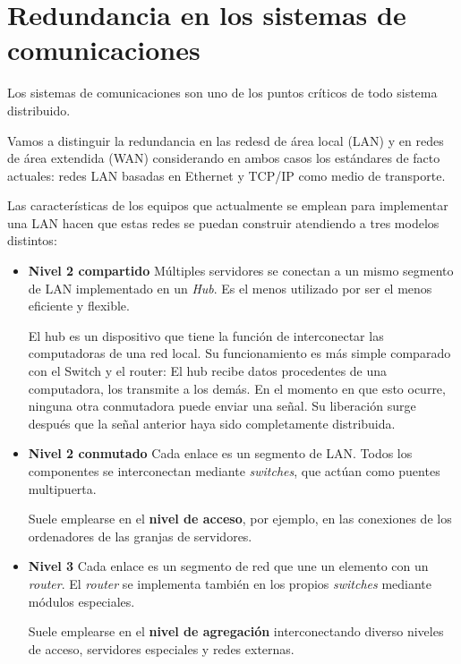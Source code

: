 \documentclass{apuntes}[nochap]
\begin{document}
\section{Redundancia en los sistemas de comunicaciones}
Los sistemas de comunicaciones son uno de los puntos críticos de todo sistema distribuido.

Vamos a distinguir la redundancia en las redesd de área local (LAN) y en redes de área extendida (WAN) considerando en ambos casos los estándares de facto actuales: redes LAN basadas en Ethernet y TCP/IP como medio de transporte.

Las características de los equipos que actualmente se emplean para implementar una LAN hacen que estas redes se puedan construir atendiendo a tres modelos distintos:
\begin{itemize}
\item \textbf{Nivel 2 compartido} Múltiples servidores se conectan a un mismo segmento de LAN implementado en un \textit{Hub}. Es el menos utilizado por ser el menos eficiente y flexible.

El hub es un dispositivo que tiene la función de interconectar las computadoras de una red local. Su funcionamiento es más simple comparado con el Switch y el router:
El hub recibe datos procedentes de una computadora, los transmite a los demás. En el momento en que esto ocurre, ninguna otra conmutadora puede enviar una señal. Su liberación surge después que la señal anterior haya sido completamente distribuida.


\item \textbf{Nivel 2 conmutado} Cada enlace es un segmento de LAN. Todos los componentes se interconectan mediante \textit{switches}, que actúan como puentes multipuerta.

Suele emplearse en el \textbf{nivel de acceso}, por ejemplo, en las conexiones de los ordenadores de las granjas de servidores.

\item \textbf{Nivel 3} Cada enlace es un segmento de red que une un elemento con un \textit{router}. El \textit{router} se implementa también en los propios \textit{switches} mediante módulos especiales.

Suele emplearse en el \textbf{nivel de agregación} interconectando diverso niveles de acceso, servidores especiales y redes externas.
\end{itemize}
\end{document}
